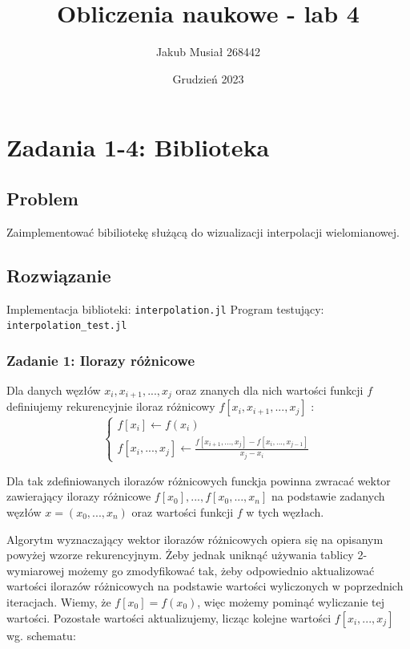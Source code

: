 \documentclass[11pt]{article}
\title{Obliczenia naukowe - lab 4}
\author{Jakub Musiał 268442}
\date{Grudzień 2023}
\begin{document}
\maketitle

\hspace{1cm}

\section*{Zadania 1-4: Biblioteka}
    \subsection*{Problem}
        Zaimplementować bibiliotekę służącą do wizualizacji interpolacji wielomianowej.

    \subsection*{Rozwiązanie}
        Implementacja biblioteki: \texttt{interpolation.jl}
        \newline
        Program testujący: \texttt{interpolation\_test.jl}

        \subsubsection*{Zadanie 1: Ilorazy różnicowe}
        Dla danych węzłów $x_i, x_{i+1}, ..., x_j$ oraz znanych dla nich wartości funkcji $f$
        definiujemy rekurencyjnie iloraz różnicowy $f[x_i, x_{i+1}, ..., x_j]$ :
        \begin{equation}
            \left
            \lbrace
            \begin{array}{l}
                f[x_i] \gets f(x_i) \\
                f[x_i, ..., x_j] \gets \frac{f[x_{i+1}, ..., x_j] - f[x_i, ..., x_{j-1}]}{x_j - x_i}
            \end{array}
            \right.
        \end{equation}

        \noindent Dla tak zdefiniowanych ilorazów różnicowych funckja powinna zwracać wektor zawierający ilorazy
        różnicowe $f[x_0], ..., f[x_0, ..., x_n]$ na podstawie zadanych węzłów $x = (x_0, ..., x_n)$ oraz wartości funkcji
        $f$ w tych węzłach.

        \noindent Algorytm wyznaczający wektor ilorazów różnicowych opiera się na opisanym powyżej wzorze rekurencyjnym.
        Żeby jednak uniknąć używania tablicy 2-wymiarowej możemy go zmodyfikować tak, żeby odpowiednio aktualizować
        wartości ilorazów różnicowych na podstawie wartości wyliczonych w poprzednich iteracjach. Wiemy, że
        $f[x_0] = f(x_0)$, więc możemy pominąć wyliczanie tej wartości. Pozostałe wartości aktualizujemy, licząc kolejne
        wartości $f[x_i, ..., x_j]$ wg. schematu:
\end{document}
